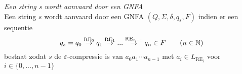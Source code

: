 \documentclass[../aanvullingen_cursus.tex]{subfiles}
\begin{document}
\begin{definitie}
	\textit{Een string s wordt aanvaard door een GNFA}\\
	Een string \(s\) wordt aanvaard door een GNFA \((Q,\Sigma,\delta,q_s,F)\) indien er een sequentie \[q_s = q_0 \overset{\text{RE}_0}{\rightarrow} q_1 \overset{\text{RE}_1}{\rightarrow} ... \overset{\text{RE}_{n-1}}{\rightarrow} q_n \in F \qquad (n \in \mathbb{N})\] bestaat zodat \(s\) de \(\varepsilon\)-compressie is van \(a_0a_1\cdots a_{n-1}\) met \(a_i \in L_{\text{RE}_i}\) voor \(i \in \{0,...,n-1\}\)
\end{definitie}
\end{document}

